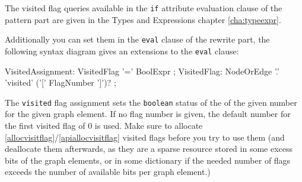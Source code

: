 The visited flag queries available in the \texttt{if} attribute evaluation clause of the pattern part are given in the Types and Expressions chapter \ref{cha:typeexpr}.

Additionally you can set them in the \texttt{eval} clause of the rewrite part, the following syntax diagram gives an extensions to the \texttt{eval} clause:

\begin{rail}
  VisitedAssignment:
    VisitedFlag '=' BoolExpr
	;
	VisitedFlag:
    NodeOrEdge '.' 'visited' ('[' FlagNumber ']')?
  ;
\end{rail}

The \texttt{visited} flag assignment sets the \texttt{boolean} status of the  of the given number for the given graph element.
If no flag number is given, the default number for the first visited flag of 0 is used.
Make sure to allocate \ref{allocvisitflag}/\ref{apiallocvisitflag} visited flags before you try to use them
(and deallocate them afterwards, as they are a sparse resource stored in some excess bits of the graph elements, or in some dictionary if the needed number of flags exceeds the number of available bits per graph element.)


